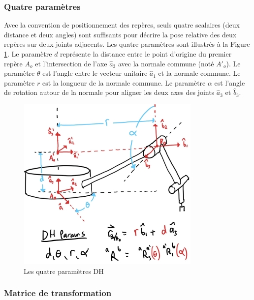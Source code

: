 \subsubsection{ Quatre paramètres }

Avec la convention de positionnement des repères, seuls quatre scalaires (deux distance et deux angles) sont suffisants pour décrire la pose relative des deux repères sur deux joints adjacents. Les quatre paramètres sont illustrés à la Figure \ref{fig:dh2}. Le paramètre $d$ représente la distance entre le point d'origine du premier repère $A_o$ et l'intersection de l'axe $\hat{a}_3$ avec la normale commune (noté $A'_o$).  Le paramètre $\theta$ est l'angle entre le vecteur unitaire $\hat{a}_1$ et la normale commune. Le paramètre $r$ est la longueur de la normale commune. Le paramètre $\alpha$ est l'angle de rotation autour de la normale pour aligner les deux axes des joints $\hat{a}_3$ et $\hat{b}_3$.
\begin{figure}[H]
	\centering
		\includegraphics[width=0.80\textwidth]{fig/dh2.jpg}
	\caption{Les quatre paramètres DH}
	\label{fig:dh2}
\end{figure}

\subsubsection{Matrice de transformation}

